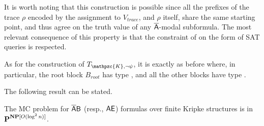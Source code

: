 It is worth noting that this construction is possible since all the prefixes of the trace $\rho$ encoded by the assignment to $V_{trace}$, 
and $\rho$ itself, share the same starting point, and thus agree on the truth value of any $\mathsf{\overline{A}}$-modal subformula. The most relevant consequence of this property is that  the constraint of \TBSATM{} on the form of SAT queries is respected.




As for the construction of $T_{\mathpzc{K},\neg\psi}$, it is exactly as before where, in particular, the root block $B_{root}$ has type \forw, and all the other blocks have type \back. 

The following result can be stated. 
%
\begin{theorem}\label{th:AbarBalgo}
The MC problem for $\mathsf{\overline{A}B}$ (resp., $\mathsf{AE}$) formulas over finite Kripke structures is in $\textbf{P}^{\textbf{NP}[O(\log^2 n)]}$.
\end{theorem}


